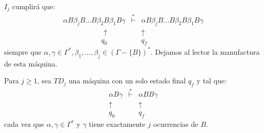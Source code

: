 \begin{frame}
  \PN $I_{j}$ cumplirá que:
  \begin{equation*}
    \begin{array}{lcr}
      \alpha B \beta_{j} B \dotsc B \beta_{2} B \beta_{1} B \gamma &\overset{\ast}{\vdash}& \alpha B \beta_{j} B \dotsc
        B \beta_{2} B \beta_{1} B \gamma \\
      \ \ \ \ \ \ \ \ \ \ \ \ \ \ \ \ \ \ \ \ \ \ \ \;\; \uparrow && \uparrow \ \ \ \ \ \ \ \ \ \ \ \ \ \ \ \ \ \ \ \ \
        \ \ \  \\
      \ \ \ \ \ \ \ \ \ \ \ \ \ \ \ \ \ \ \ \ \ \ \ \ q_{0} && q_{f} \ \ \ \ \ \ \ \ \ \ \ \ \ \ \ \ \ \ \ \ \ \ \
    \end{array}
  \end{equation*}
  \PN siempre que $\alpha, \gamma \in \Gamma^{\ast}, \beta_{1}, \dotsc, \beta_{j} \in (\Gamma - \{B\})^{\ast}$. Dejamos
  al lector la manufactura de esta máquina.

  \vspace{3mm}
  \PN Para $j \geq 1$, sea $TD_{j}$ una máquina con un solo estado final $q_{f}$ y tal que:
  \begin{equation*}
    \begin{array}{ccc}
      \alpha B \gamma &\overset{\ast}{\vdash}& \alpha BB \gamma \\
      \uparrow  && \uparrow \ \ \\
      q_{0} &  & q_{f} \ \
    \end{array}
  \end{equation*}
  \PN cada vez que $\alpha, \gamma \in \Gamma^{\ast}$ y $\gamma$ tiene exactamente $j$ ocurrencias de $B$.
\end{frame}
